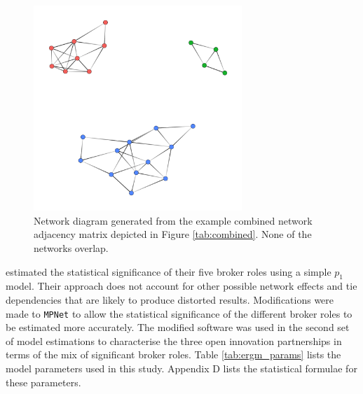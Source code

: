 \begin{figure}
\centering
\includegraphics[width = 0.7\textwidth]{Images/struc_zero_nets.png}
\caption[Directed network diagram generated from the example big network adjacency matrix]{Network diagram generated from the example combined network adjacency matrix depicted in Figure \ref{tab:combined}. None of the networks overlap.}
\label{fig:struc_zero_nets}
\end{figure}

\citet{gould1989structures} estimated the statistical significance of their five broker roles using a simple $p_1$ model. Their approach does not account for other possible network effects and tie dependencies that are likely to produce distorted results. Modifications were made to \texttt{MPNet} to allow the statistical significance of the different broker roles to be estimated more accurately. The modified software was used in the second set of model estimations to characterise the three open innovation partnerships in terms of the mix of significant broker roles. Table \ref{tab:ergm_params} lists the model parameters used in this study. Appendix D lists the statistical formulae for these parameters. \medskip

